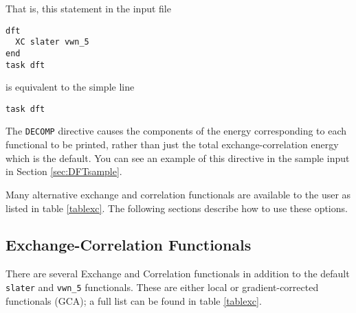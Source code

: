 That is, this statement in the input file
\begin{verbatim}
dft
  XC slater vwn_5
end
task dft
\end{verbatim}

is equivalent to the simple line
\begin{verbatim}
task dft
\end{verbatim}


The \verb+DECOMP+ directive causes the components of the energy
corresponding to each functional to be printed, rather than just the
total exchange-correlation energy which is the default.  You can see
an example of this directive in the sample input in 
Section \ref{sec:DFTsample}.


Many alternative exchange and correlation functionals are available to
the user as listed in table \ref{tablexc}.  The following sections describe 
how to use these options.

\subsection{Exchange-Correlation Functionals}

There are several Exchange and Correlation functionals in addition to the 
default {\tt slater} and {\tt vwn\_5}
functionals.  These are either local or gradient-corrected functionals (GCA);
a full list can be found in table \ref{tablexc}. 

%
%
%
%
%
%
%
%


